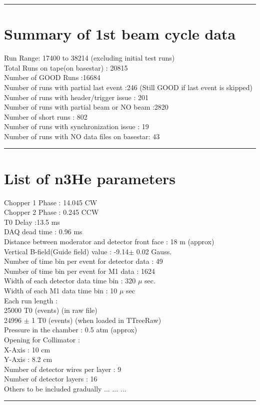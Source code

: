\documentclass[12pt]{article}
\begin{document}
\noindent
{\color{red} \rule{\linewidth}{1mm} }


\newpage
\section{Summary of 1st beam cycle data}
Run Range: 17400 to 38214 (excluding initial test runs)\\
Total Runs on tape(on basestar) : 20815 \\
Number of GOOD Runs :16684 \\
Number of runs with partial last event :246 (Still GOOD if last event is skipped)\\
Number of runs with header/trigger issue : 201 \\
Number of runs with partial beam or NO beam :2820 \\
Number of short runs : 802 \\
Number of runs with synchronization issue : 19 \\
Number of runs with NO data files on basestar: 43 \\
   

\noindent
{\color{red} \rule{\linewidth}{1mm} }

\newpage
\section{List of n3He parameters}

Chopper 1 Phase : 14.045 CW \\
Chopper 2 Phase : 0.245 CCW \\
T0 Delay :13.5 ms \\
DAQ dead time : 0.96 ms \\
Distance between moderator and detector front face : 18 m (approx) \\
Vertical B-field(Guide field) value : -9.14$\pm$ 0.02 Gauss.\\
Number of time bin per event for detector data : 49\\
Number of time bin per event for M1 data : 1624\\
Width of each detector data time bin : 320 $\mu$ sec.\\
Width of each M1 data time bin : 10 $\mu$ sec\\
Each run length : \\
\hspace{5cm} 25000 T0 (events) (in raw file)\\
\hspace{5cm} 24996 $\pm$ 1 T0 (events) (when loaded in TTreeRaw)\\
Pressure in the chamber : 0.5 atm (approx) \\
Opening for Collimator :  \\
\hspace{5cm} X-Axis : 10 cm \\
\hspace{5cm} Y-Axis : 8.2 cm \\
Number of detector wires per layer : 9 \\
Number of detector layers : 16 \\


Others to be included gradually ... ... ... \\



\noindent
{\color{red} \rule{\linewidth}{1mm} }
\end{document}
